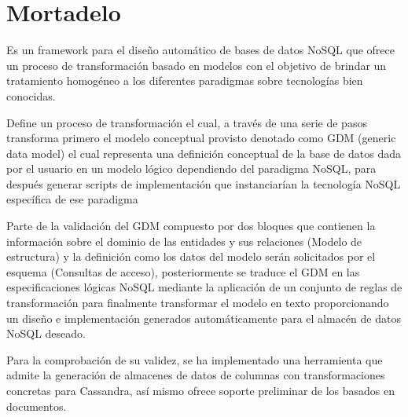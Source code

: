 \section{Mortadelo}
Es un framework para el diseño automático de bases de datos NoSQL que ofrece un proceso de transformación basado en modelos con el objetivo de brindar un tratamiento homogéneo a los diferentes paradigmas sobre tecnologías bien conocidas. 


Define un proceso de transformación el cual, a través de una serie de pasos transforma primero el modelo conceptual provisto denotado como GDM (generic data model) el cual representa una definición conceptual de la base de datos dada por el usuario en un modelo lógico dependiendo del paradigma NoSQL, para después generar scripts de implementación que instanciarían la tecnología NoSQL específica de ese paradigma


Parte de la validación del GDM compuesto por dos bloques que contienen la información sobre el dominio de las entidades y sus relaciones (Modelo de estructura) y la definición como los datos del modelo serán solicitados por el esquema (Consultas de acceso), posteriormente se traduce el GDM en las especificaciones lógicas NoSQL mediante la aplicación de un conjunto de reglas de transformación para finalmente transformar el modelo en texto proporcionando un diseño e implementación generados automáticamente para el almacén de datos NoSQL deseado.


Para la comprobación de su validez, se ha implementado una herramienta que admite la generación de almacenes de datos de columnas con transformaciones concretas para Cassandra, así mismo ofrece soporte preliminar de los basados ​​en documentos.
